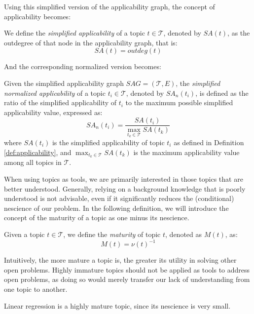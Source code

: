 Using this simplified version of the applicability graph, the concept of applicability becomes:

\begin{definition}
\label{def:simplified-applicability}
We define the \emph{simplified applicability} of a topic $t\in \mathcal{T}$, denoted by $SA(t)$, as the outdegree of that node in the applicability graph, that is:
\[
SA(t) = outdeg(t)
\]
\end{definition}

And the corresponding normalized version becomes:

\begin{definition}
\label{def:normalized-simplified-applicability}
Given the simplified applicability graph $SAG = (\mathcal{T}, E)$, the \emph{simplified normalized applicability} of a topic $t_i \in \mathcal{T}$, denoted by $SA_n(t_i)$, is defined as the ratio of the simplified applicability of $t_i$ to the maximum possible simplified applicability value, expressed as:
\[
SA_n(t_i) = \frac{SA(t_i)}{\max_{t_k \in \mathcal{T}} SA(t_k)}
\]
where $SA(t_i)$ is the simplified applicability of topic $t_i$ as defined in Definition \ref{def:applicability}, and $\max_{t_k \in \mathcal{T}} SA(t_k)$ is the maximum applicability value among all topics in $\mathcal{T}$.
\end{definition}

When using topics as tools, we are primarily interested in those topics that are better understood. Generally, relying on a background knowledge that is poorly understood is not advisable, even if it significantly reduces the (conditional) nescience of our problem. In the following definition, we will introduce the concept of the maturity of a topic as one minus its nescience.

\begin{definition}
Given a topic $t \in \mathcal{T}$, we define the \emph{maturity} of topic $t$, denoted as $M(t)$, as:
\[
M(t) = \nu(t)^{-1}
\]
\end{definition}

Intuitively, the more mature a topic is, the greater its utility in solving other open problems. Highly immature topics should not be applied as tools to address open problems, as doing so would merely transfer our lack of understanding from one topic to another.

\begin{example}
Linear regression is a highly mature topic, since its nescience is very small.
\end{example}

